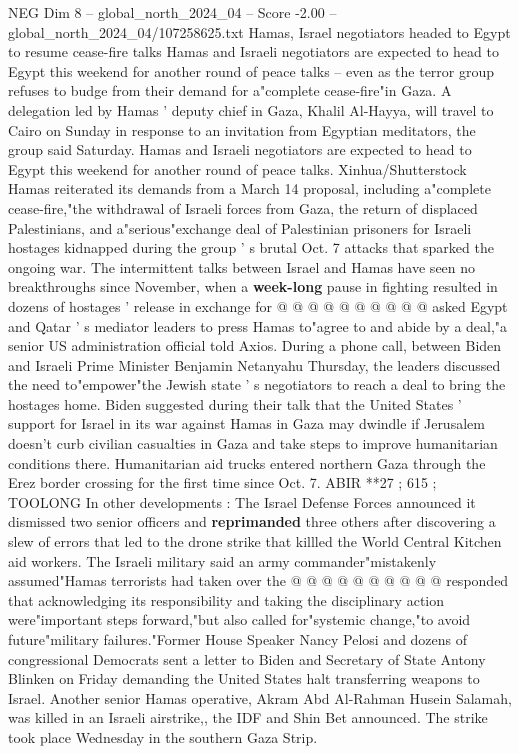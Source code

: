 \begin{textsample}{NEG Dim 8 – global\_north\_2024\_04 – Score -2.00 – global\_north\_2024\_04/107258625.txt}  \label{ex:f8_neg_129}
Hamas, Israel negotiators headed to Egypt to resume cease-fire talks Hamas and Israeli negotiators are expected to head to Egypt this weekend for another round of peace talks -- even as the terror group refuses to budge from their demand for a"complete cease-fire"in Gaza.
A delegation led by Hamas ' deputy chief in Gaza, Khalil Al-Hayya, will travel to Cairo on Sunday in response to an invitation from Egyptian meditators, the group said Saturday.
Hamas and Israeli negotiators are expected to head to Egypt this weekend for another round of peace talks.
Xinhua/Shutterstock Hamas reiterated its demands from a March 14 proposal, including a"complete cease-fire,"the withdrawal of Israeli forces from Gaza, the return of displaced Palestinians, and a"serious"exchange deal of Palestinian prisoners for Israeli hostages kidnapped during the group ' s brutal Oct. 7 attacks that sparked the ongoing war.
The intermittent talks between Israel and Hamas have seen no breakthroughs since November, when a \textbf{week-long} pause in fighting resulted in dozens of hostages ' release in exchange for @ @ @ @ @ @ @ @ @ @ asked Egypt and Qatar ' s mediator leaders to press Hamas to"agree to and abide by a deal,"a senior US administration official told Axios.
During a phone call, between Biden and Israeli Prime Minister Benjamin Netanyahu Thursday, the leaders discussed the need to"empower"the Jewish state ' s negotiators to reach a deal to bring the hostages home.
Biden suggested during their talk that the United States ' support for Israel in its war against Hamas in Gaza may dwindle if Jerusalem doesn't curb civilian casualties in Gaza and take steps to improve humanitarian conditions there.
Humanitarian aid trucks entered northern Gaza through the Erez border crossing for the first time since Oct. 7.
ABIR **27 ; 615 ; TOOLONG In other developments : The Israel Defense Forces announced it dismissed two senior officers and \textbf{reprimanded} three others after discovering a slew of errors that led to the drone strike that killled the World Central Kitchen aid workers.
The Israeli military said an army commander"mistakenly assumed"Hamas terrorists had taken over the @ @ @ @ @ @ @ @ @ @ responded that acknowledging its responsibility and taking the disciplinary action were"important steps forward,"but also called for"systemic change,"to avoid future"military failures."Former House Speaker Nancy Pelosi and dozens of congressional Democrats sent a letter to Biden and Secretary of State Antony Blinken on Friday demanding the United States halt transferring weapons to Israel.
Another senior Hamas operative, Akram Abd Al-Rahman Husein Salamah, was killed in an Israeli airstrike,, the IDF and Shin Bet announced.
The strike took place Wednesday in the southern Gaza Strip.

\end{textsample}
